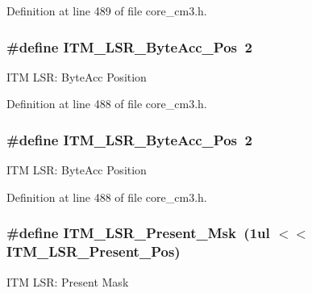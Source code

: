 Definition at line 489 of file core\+\_\+cm3.\+h.

\subsubsection[{\texorpdfstring{I\+T\+M\+\_\+\+L\+S\+R\+\_\+\+Byte\+Acc\+\_\+\+Pos}{ITM_LSR_ByteAcc_Pos}}]{\setlength{\rightskip}{0pt plus 5cm}\#define I\+T\+M\+\_\+\+L\+S\+R\+\_\+\+Byte\+Acc\+\_\+\+Pos~2}\hypertarget{group___c_m_s_i_s___c_m3___i_t_m_gabfae3e570edc8759597311ed6dfb478e}{}\label{group___c_m_s_i_s___c_m3___i_t_m_gabfae3e570edc8759597311ed6dfb478e}
I\+TM L\+SR\+: Byte\+Acc Position 

Definition at line 488 of file core\+\_\+cm3.\+h.

\subsubsection[{\texorpdfstring{I\+T\+M\+\_\+\+L\+S\+R\+\_\+\+Byte\+Acc\+\_\+\+Pos}{ITM_LSR_ByteAcc_Pos}}]{\setlength{\rightskip}{0pt plus 5cm}\#define I\+T\+M\+\_\+\+L\+S\+R\+\_\+\+Byte\+Acc\+\_\+\+Pos~2}\hypertarget{group___c_m_s_i_s___c_m3___i_t_m_gabfae3e570edc8759597311ed6dfb478e}{}\label{group___c_m_s_i_s___c_m3___i_t_m_gabfae3e570edc8759597311ed6dfb478e}
I\+TM L\+SR\+: Byte\+Acc Position 

Definition at line 488 of file core\+\_\+cm3.\+h.

\subsubsection[{\texorpdfstring{I\+T\+M\+\_\+\+L\+S\+R\+\_\+\+Present\+\_\+\+Msk}{ITM_LSR_Present_Msk}}]{\setlength{\rightskip}{0pt plus 5cm}\#define I\+T\+M\+\_\+\+L\+S\+R\+\_\+\+Present\+\_\+\+Msk~(1ul $<$$<$ I\+T\+M\+\_\+\+L\+S\+R\+\_\+\+Present\+\_\+\+Pos)}\hypertarget{group___c_m_s_i_s___c_m3___i_t_m_gaa5bc2a7f5f1d69ff819531f5508bb017}{}\label{group___c_m_s_i_s___c_m3___i_t_m_gaa5bc2a7f5f1d69ff819531f5508bb017}
I\+TM L\+SR\+: Present Mask 


